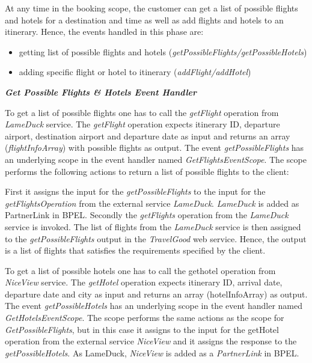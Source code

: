 At any time in the booking scope, the customer can get a list of possible flights and hotels for a destination and time as well as add flights and hotels to an itinerary. Hence, the events handled in this phase are:
\begin{itemize}
\item getting list of possible flights and hotels (\textit{getPossibleFlights/getPossibleHotels})
\item adding specific flight or hotel to itinerary (\textit{addFlight/addHotel})
\end{itemize}

\textbf{\textit{Get Possible Flights \& Hotels Event Handler}}

To get a list of possible flights one has to call the \textit{getFlight} operation from \textit{LameDuck} service. The \textit{getFlight} operation expects itinerary ID, departure airport, destination airport and departure date as input and returns an array (\textit{flightInfoArray}) with possible flights as output. The event \textit{getPossibleFlights} has an underlying scope in the event handler named \textit{GetFlightsEventScope}. The scope performs the following actions to return a list of possible flights to the client:
 
First it assigns the input for the \textit{getPossibleFlights} to the input for the \textit{getFlightsOperation} from the external service \textit{LameDuck}. \textit{LameDuck} is added as PartnerLink in BPEL.
Secondly the \textit{getFlights} operation from the \textit{LameDuck} service is invoked.
The list of flights from the \textit{LameDuck} service is then assigned to the \textit{getPossibleFlights} output in the \textit{TravelGood} web service. Hence, the output is a list of flights that satisfies the requirements specified by the client.
 
To get a list of possible hotels one has to call the gethotel operation from \textit{NiceView} service. The \textit{getHotel} operation expects itinerary ID, arrival date, departure date and city as input and returns an array (hotelInfoArray) as output. The event \textit{getPossibleHotels} has an underlying scope in the event handler named \textit{GetHotelsEventScope}. The scope performs the same actions as the scope for \textit{GetPossibleFlights}, but in this case it assigns to the input for the getHotel operation from the external service \textit{NiceView} and it assigns the response to the \textit{getPossibleHotels}. As LameDuck, \textit{NiceView} is added as a \textit{PartnerLink} in BPEL.


